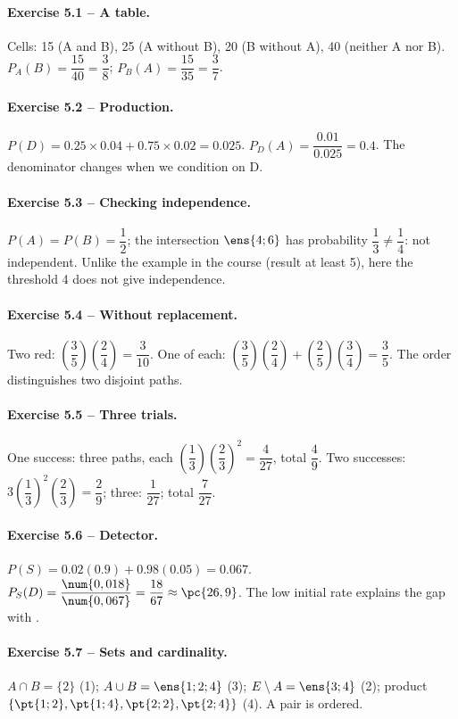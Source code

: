 \paragraph{Exercise 5.1 -- A table.} Cells: 15 (A and B), 25 (A without B), 20 (B without A), 40 (neither A nor B). $P_A(B)=\dfrac{15}{40}=\dfrac{3}{8}$; $P_B(A)=\dfrac{15}{35}=\dfrac{3}{7}$.
\paragraph{Exercise 5.2 -- Production.} $P(D)=\num{0,25}\times\num{0,04}+\num{0,75}\times\num{0,02}=\num{0,025}$. $P_D(A)=\dfrac{\num{0,01}}{\num{0,025}}=\num{0,4}$. The denominator changes when we condition on D.
\paragraph{Exercise 5.3 -- Checking independence.} $P(A)=P(B)=\dfrac{1}{2}$; the intersection $\ens{4;6}$ has probability $\dfrac{1}{3}\ne \dfrac{1}{4}$: not independent. Unlike the example in the course (result at least 5), here the threshold 4 does not give independence.
\paragraph{Exercise 5.4 -- Without replacement.} Two red: $(\dfrac{3}{5})(\dfrac{2}{4})=\dfrac{3}{10}$. One of each: $(\dfrac{3}{5})(\dfrac{2}{4})+(\dfrac{2}{5})(\dfrac{3}{4})=\dfrac{3}{5}$. The order distinguishes two disjoint paths.
\paragraph{Exercise 5.5 -- Three trials.} One success: three paths, each $(\dfrac{1}{3})(\dfrac{2}{3})^2=\dfrac{4}{27}$, total $\dfrac{4}{9}$. Two successes: $3(\dfrac{1}{3})^2(\dfrac{2}{3})=\dfrac{2}{9}$; three: $\dfrac{1}{27}$; total $\dfrac{7}{27}$.
\paragraph{Exercise 5.6 -- Detector.} $P(S)=\num{0,02}(\num{0,9})+\num{0,98}(\num{0,05})=\num{0,067}$. $P_S(D)=\dfrac{\num{0,018}}{\num{0,067}}=\dfrac{18}{67}\approx \pc{26,9}$. The low initial rate explains the gap with .
\paragraph{Exercise 5.7 -- Sets and cardinality.} $A\cap B=\{2\}$ (1); $A\cup B=\ens{1;2;4}$ (3); $E\setminus A=\ens{3;4}$ (2); product $\{\pt{1;2},\pt{1;4},\pt{2;2},\pt{2;4}\}$ (4). A pair is ordered.
